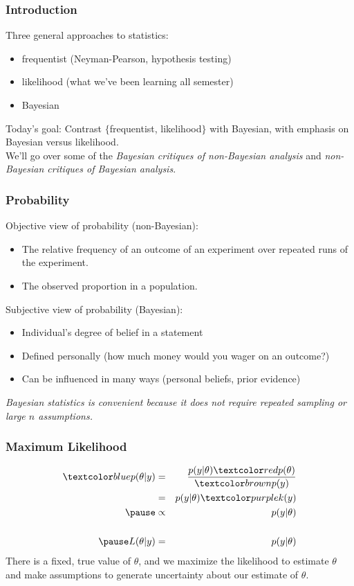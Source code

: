 \documentclass[handout]{beamer}
\begin{document}
\begin{frame}[fragile]
\frametitle{Introduction}
\pause
Three general approaches to statistics:
\pause
\begin{itemize}
\item frequentist (Neyman-Pearson, hypothesis testing)
\pause
\item likelihood (what we've been learning all semester)
\pause
\item Bayesian
\end{itemize}
\pause
\bigskip
Today's goal: Contrast $\{$frequentist, likelihood$\}$ with Bayesian,
\pause with emphasis on Bayesian versus likelihood.\\
\pause
\bigskip
We'll go over some of the \emph{Bayesian critiques of
non-Bayesian analysis} \pause and {\it non-Bayesian critiques of Bayesian analysis}.
\end{frame}

\begin{frame}
\frametitle{Probability}
\pause
Objective view of probability (non-Bayesian):
\pause
\begin{itemize}
\item The relative frequency of an outcome of an experiment over
repeated runs of the experiment.
\pause
\item The observed proportion in a population.
\end{itemize}
\pause
\bigskip
Subjective view of probability (Bayesian):
\pause
\begin{itemize}
\item Individual's degree of belief in a statement
\pause
\item Defined personally \pause (how much money would you wager on an
outcome?)
\pause
\item Can be influenced in many ways (personal beliefs, prior evidence)
\end{itemize}
\pause
\bigskip
\emph{Bayesian statistics is convenient because it does not require
repeated sampling or large $n$ assumptions.} 
\end{frame}

\begin{frame}
\frametitle{Maximum Likelihood}
\pause
\begin{eqnarray*}
\blue{p(\theta | y)} &=& \frac{p(y | \theta) \red{p(\theta)} }{\brown{p(y)}} \\
&=& p(y| \theta) \purple{k(y)} \\
\pause
&\propto& p(y | \theta) \\\\
\pause
L(\theta | y) &=& p(y | \theta)\\
\end{eqnarray*}
\pause
There is a fixed, true value of $\theta$, \pause and we maximize the
likelihood to estimate $\theta$ and make assumptions to generate
uncertainty about our estimate of $\theta$.
\end{frame}
\end{document}
